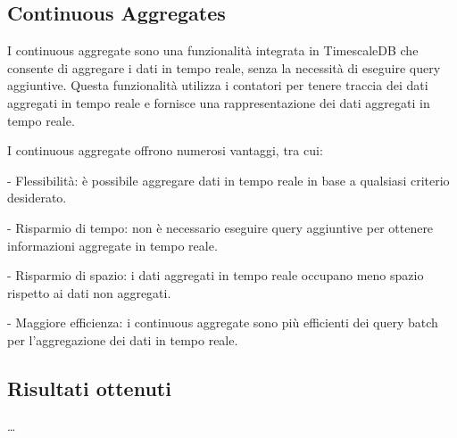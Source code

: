 \subsection{Continuous Aggregates}\label{ssec:cont-aggr}
I continuous aggregate sono una funzionalità integrata in TimescaleDB che consente di aggregare i dati in tempo reale, senza la necessità di eseguire query aggiuntive. Questa funzionalità utilizza i contatori per tenere traccia dei dati aggregati in tempo reale e fornisce una rappresentazione dei dati aggregati in tempo reale.

I continuous aggregate offrono numerosi vantaggi, tra cui:

- Flessibilità: è possibile aggregare dati in tempo reale in base a qualsiasi criterio desiderato.

- Risparmio di tempo: non è necessario eseguire query aggiuntive per ottenere informazioni aggregate in tempo reale.

- Risparmio di spazio: i dati aggregati in tempo reale occupano meno spazio rispetto ai dati non aggregati.

- Maggiore efficienza: i continuous aggregate sono più efficienti dei query batch per l'aggregazione dei dati in tempo reale.

\subsection{Risultati ottenuti}\label{ssec:cont-aggr-risultati}
\ldots